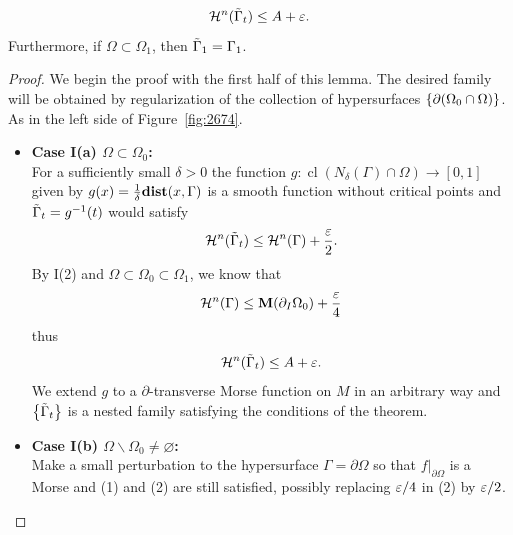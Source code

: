 \begin{lemma}
\begin{enumerate}
        \begin{equation*}
            \mathcal{H}^n(\Tilde{\Gamma}_t) \leq A + \varepsilon.
        \end{equation*}
        Furthermore, if $\Omega \subset \Omega_1$, then $\Tilde{\Gamma}_1 = \Gamma_1$.
    \end{enumerate}
    \begin{proof}
        We begin the proof with the first half of this lemma.
        The desired family will be obtained by regularization of the collection of hypersurfaces $\left\{\partial(\Omega_0\cap \Omega)\right\}$. As in the left side of Figure~\ref{fig:2674}.
        \begin{itemize}
            \item \textbf{Case I(a) $\Omega\subset \Omega_0$:}\\
            For a sufficiently small $\delta > 0$ the function $g: \operatorname{cl}(N_{\delta}(\Gamma)\cap \Omega)\to [0, 1]$ given by $g(x) = \frac{1}{\delta}\mathbf{dist}(x, \Gamma)$ is a smooth function without critical points and $\Tilde{\Gamma}_t = g^{-1}(t)$ would satisfy
            \begin{equation*}
                \mathcal{H}^n(\Tilde{\Gamma}_t) \leq \mathcal{H}^n(\Gamma) + \frac{\varepsilon}{2}.
            \end{equation*}
            By I(2) and $\Omega \subset \Omega_0 \subset \Omega_1$, we know that
            \begin{equation*}
                \mathcal{H}^n(\Gamma) \leq \mathbf{M}(\partial_I\Omega_0) + \frac{\varepsilon}{4}
            \end{equation*}
            thus
            \begin{equation*}
                \mathcal{H}^n(\Tilde{\Gamma}_t) \leq A + \varepsilon.
            \end{equation*}
            We extend $g$ to a $\partial$-transverse Morse function on $M$ in an arbitrary way and $\left\{\Tilde{\Gamma}_t\right\}$ is a nested family satisfying the conditions of the theorem.
            \item \textbf{Case I(b) $\Omega\backslash \Omega_0 \neq \varnothing$:}\\
            Make a small perturbation to the hypersurface $\Gamma = \partial\Omega$ so that $f|_{\partial\Omega}$ is a Morse and (1) and (2) are still satisfied, possibly replacing $\varepsilon/4$ in (2) by $\varepsilon/2$.


\end{itemize}
\end{proof}
\end{lemma}
